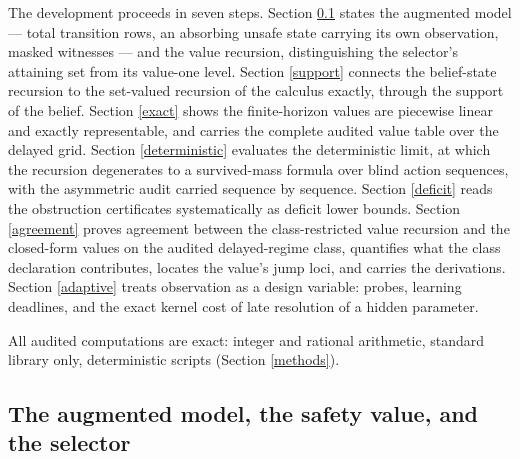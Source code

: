 \documentclass[10pt,twocolumn]{article}
\theoremstyle{plain}
\theoremstyle{definition}
\theoremstyle{remark}
\begin{document}
The development proceeds in seven steps. Section \ref{model} states the
augmented model --- total transition rows, an absorbing unsafe state
carrying its own observation, masked witnesses --- and the value recursion,
distinguishing the selector's attaining set from its value-one level.
Section \ref{support} connects the belief-state recursion to the
set-valued recursion of the calculus exactly, through the support of the
belief. Section \ref{exact} shows the finite-horizon values are piecewise
linear and exactly representable, and carries the complete audited value
table over the delayed grid. Section \ref{deterministic} evaluates the
deterministic limit, at which the recursion degenerates to a
survived-mass formula over blind action sequences, with the asymmetric
audit carried sequence by sequence. Section \ref{deficit} reads the
obstruction certificates systematically as deficit lower bounds. Section
\ref{agreement} proves agreement between the class-restricted value
recursion and the closed-form values on the audited delayed-regime class,
quantifies what the class declaration contributes, locates the value's
jump loci, and carries the derivations. Section \ref{adaptive} treats
observation as a design variable: probes, learning deadlines, and the
exact kernel cost of late resolution of a hidden parameter.

All audited computations are exact: integer and rational arithmetic,
standard library only, deterministic scripts (Section \ref{methods}).

\subsection{The augmented model, the safety value, and the selector}\label{model}
\end{document}
